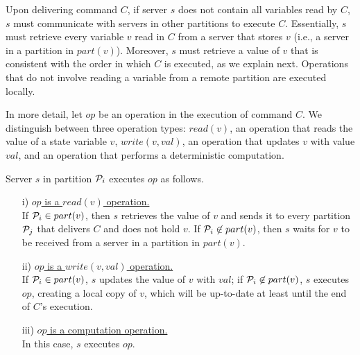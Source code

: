 Upon delivering command $C$, if server $s$ does not contain all variables read by $C$, $s$ must communicate with servers in other partitions to execute $C$. 
%
Essentially, $s$ must retrieve every variable $v$ read in $C$ from a server that stores $v$ (i.e., a server in a partition in $part(v)$).
Moreover, $s$ must retrieve a value of $v$ that is consistent with the order in which $C$ is executed, as we explain next.
Operations that do not involve reading a variable from a remote partition are executed locally.

%

In more detail, let $op$ be an operation in the execution of command $C$.
We distinguish between three operation types: $read(v)$, an operation that reads the value of a state variable $v$, $write(v, val)$, an operation that updates $v$ with value $val$,
and an operation that performs a deterministic computation.

Server $s$ in partition $\mathcal{P}_i$ executes $op$ as follows.

\begin{itemize}

\item[i)] \underline{$op$ is a $read(v)$ operation.} \\
If $\mathcal{P}_i \in part(v)$, then $s$ retrieves the value of $v$ and sends it to every partition $\mathcal{P}_j$ that delivers $C$ and does not hold $v$. If $\mathcal{P}_i \not\in part(v)$, then $s$ waits for $v$ to be received from a server in a partition in $part(v)$.

\item[ii)] \underline{$op$ is a $write(v,val)$ operation.} \\
If $\mathcal{P}_i \in part(v)$, $s$ updates the value of $v$ with $val$; if $\mathcal{P}_i \not\in part(v)$, $s$ executes $op$, creating a local copy of $v$, which will be up-to-date at least until the end of $C$'s execution.

\item[iii)] \underline{$op$ is a computation operation.}\\
In this case, $s$ executes $op$.

\end{itemize}

